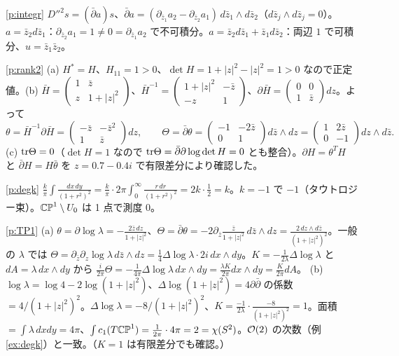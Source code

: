 \begin{sol}{\ref{p:integr}}
$D''^2s=(\bar\partial a)s$、$\bar\partial a=(\partial_{\bar z_1}a_2-\partial_{\bar z_2}a_1)\,d\bar z_1\wedge d\bar z_2$（$d\bar z_j\wedge d\bar z_j=0$）。$a=\bar z_2d\bar z_1$：$\partial_{\bar z_2}a_1=1\ne0=\partial_{\bar z_1}a_2$ で不可積分。$a=\bar z_2d\bar z_1+\bar z_1d\bar z_2$：両辺 $1$ で可積分、$u=\bar z_1\bar z_2$。
\end{sol}
\begin{sol}{\ref{p:rank2}}
(a) $H^*=H$、$H_{11}=1>0$、$\det H=1+|z|^2-|z|^2=1>0$ なので正定値。(b) $\bar H=\begin{pmatrix}1&\bar z\\z&1+|z|^2\end{pmatrix}$、$\bar H^{-1}=\begin{pmatrix}1+|z|^2&-\bar z\\-z&1\end{pmatrix}$、$\partial\bar H=\begin{pmatrix}0&0\\1&\bar z\end{pmatrix}dz$。よって
\[
\theta=\bar H^{-1}\partial\bar H=\begin{pmatrix}-\bar z&-\bar z^2\\1&\bar z\end{pmatrix}dz,\qquad
\Theta=\bar\partial\theta=\begin{pmatrix}-1&-2\bar z\\0&1\end{pmatrix}d\bar z\wedge dz=\begin{pmatrix}1&2\bar z\\0&-1\end{pmatrix}dz\wedge d\bar z.
\]
(c) $\mathrm{tr}\Theta=0$（$\det H=1$ なので $\mathrm{tr}\Theta=\bar\partial\partial\log\det H=0$ とも整合）。$\partial H=\theta^TH$ と $\bar\partial H=H\bar\theta$ を $z=0.7-0.4i$ で有限差分により確認した。
\end{sol}
\begin{sol}{\ref{p:degk}}
$\frac k\pi\int\frac{dx\,dy}{(1+r^2)^2}=\frac k\pi\cdot2\pi\int_0^\infty\frac{r\,dr}{(1+r^2)^2}=2k\cdot\frac12=k$。$k=-1$ で $-1$（タウトロジー束）。$\mathbb{CP}^1\setminus U_0$ は 1 点で測度 $0$。
\end{sol}
\begin{sol}{\ref{p:TP1}}
(a) $\theta=\partial\log\lambda=-\frac{2\bar z\,dz}{1+|z|^2}$、$\Theta=\bar\partial\theta=-2\partial_{\bar z}\frac{\bar z}{1+|z|^2}\,d\bar z\wedge dz=\frac{2\,dz\wedge d\bar z}{(1+|z|^2)^2}$。一般の $\lambda$ では $\Theta=\partial_{\bar z}\partial_z\log\lambda\,d\bar z\wedge dz=\frac14\Delta\log\lambda\cdot2i\,dx\wedge dy$。$K=-\frac1{2\lambda}\Delta\log\lambda$ と $dA=\lambda\,dx\wedge dy$ から $\frac i{2\pi}\Theta=-\frac1{4\pi}\Delta\log\lambda\,dx\wedge dy=\frac{\lambda K}{2\pi}dx\wedge dy=\frac K{2\pi}dA$。
(b) $\log\lambda=\log4-2\log(1+|z|^2)$、$\Delta\log(1+|z|^2)=4\partial\bar\partial$ の係数 $=4/(1+|z|^2)^2$。$\Delta\log\lambda=-8/(1+|z|^2)^2$、$K=\frac{-1}{2\lambda}\cdot\frac{-8}{(1+|z|^2)^2}=1$。面積 $=\int\lambda\,dxdy=4\pi$、$\int c_1(T\mathbb{CP}^1)=\frac1{2\pi}\cdot4\pi=2=\chi(S^2)$。$\mathcal O(2)$ の次数（例 \ref{ex:degk}）と一致。（$K=1$ は有限差分でも確認。）
\end{sol}
